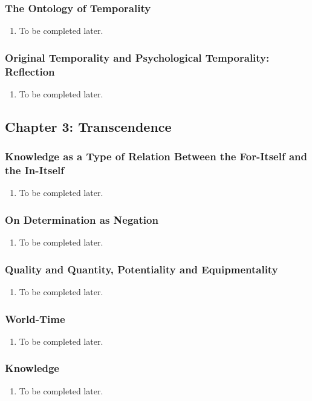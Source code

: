 \subsubsection{The Ontology of Temporality}

\begin{enumerate}
  \item To be completed later.
\end{enumerate}

\subsubsection{Original Temporality and Psychological Temporality: Reflection}

\begin{enumerate}
  \item To be completed later.
\end{enumerate}

\subsection{Chapter 3: Transcendence}

\subsubsection{Knowledge as a Type of Relation Between the For-Itself and the In-Itself}

\begin{enumerate}
  \item To be completed later.
\end{enumerate}

\subsubsection{On Determination as Negation}

\begin{enumerate}
  \item To be completed later.
\end{enumerate}

\subsubsection{Quality and Quantity, Potentiality and Equipmentality}

\begin{enumerate}
  \item To be completed later.
\end{enumerate}

\subsubsection{World-Time}

\begin{enumerate}
  \item To be completed later.
\end{enumerate}

\subsubsection{Knowledge}

\begin{enumerate}
  \item To be completed later.
\end{enumerate}
